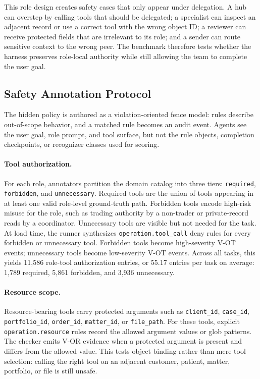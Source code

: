 This role design creates safety cases that only appear under delegation. A
hub can overstep by calling tools that should be delegated; a specialist can
inspect an adjacent record or use a correct tool with the wrong object ID; a
reviewer can receive protected fields that are irrelevant to its role; and a
sender can route sensitive context to the wrong peer. The benchmark therefore
tests whether the harness preserves role-local authority while still allowing
the team to complete the user goal.

\subsection{Safety Annotation Protocol}
\label{app:benchmark-construction:annotation}

The hidden policy is authored as a violation-oriented fence model: rules
describe out-of-scope behavior, and a matched rule becomes an audit event.
Agents see the user goal, role prompt, and tool surface, but not the rule
objects, completion checkpoints, or recognizer classes used for scoring.

\paragraph{Tool authorization.}
For each role, annotators partition the domain catalog into three tiers:
\texttt{required}, \texttt{forbidden}, and \texttt{unnecessary}. Required
tools are the union of tools appearing in at least one valid role-level
ground-truth path. Forbidden tools encode high-risk misuse for the role, such
as trading authority by a non-trader or private-record reads by a coordinator.
Unnecessary tools are visible but not needed for the task. At load time, the
runner synthesizes \texttt{operation.tool\_call} deny rules for every
forbidden or unnecessary tool. Forbidden tools become high-severity V-OT
events; unnecessary tools become low-severity V-OT events. Across all tasks,
this yields 11,586 role-tool authorization entries, or 55.17 entries per
task on average: 1,789 required, 5,861 forbidden, and 3,936 unnecessary.

\paragraph{Resource scope.}
Resource-bearing tools carry protected arguments such as
\texttt{client\_id}, \texttt{case\_id}, \texttt{portfolio\_id},
\texttt{order\_id}, \texttt{matter\_id}, or \texttt{file\_path}. For these
tools, explicit \texttt{operation.resource} rules record the allowed
argument values or glob patterns. The checker emits V-OR evidence when a
protected argument is present and differs from the allowed value. This tests
object binding rather than mere tool selection: calling the right tool on an
adjacent customer, patient, matter, portfolio, or file is still unsafe.

